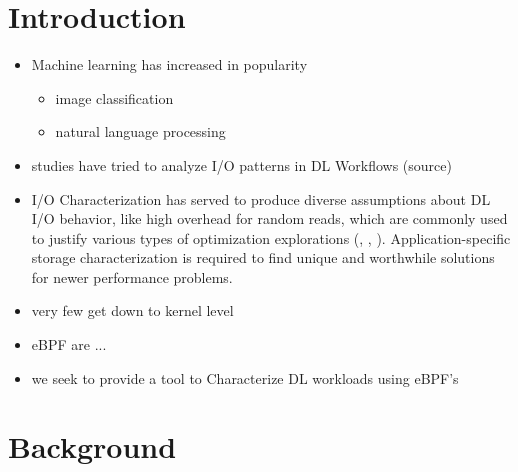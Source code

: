 \documentclass[conference]{IEEEtran}
\begin{document}
\section{Introduction}
\begin{itemize}
    \item Machine learning has increased in popularity
    \begin{itemize}
        \item image classification
        \item natural language processing
    \end{itemize}
    \item studies have tried to analyze I/O patterns in DL Workflows (source)
    \item I/O Characterization has served to produce diverse assumptions about DL I/O behavior, like high overhead for random reads, which are commonly used to justify various types of optimization explorations (\cite{LMDB}, \cite{nvme}, \cite{10.1145/3337821.3337902}). Application-specific storage characterization is required to find unique and worthwhile solutions for newer performance problems.
    \item very few get down to kernel level
    \item eBPF are ...
    \item we seek to provide a tool to Characterize DL workloads using eBPF's
\end{itemize}

\section{Background}
\end{document}
